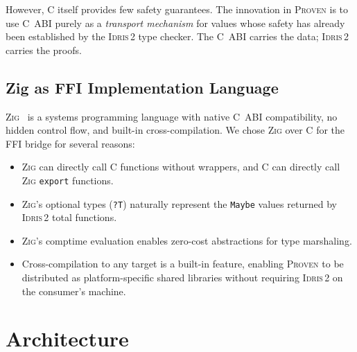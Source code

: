 \documentclass[11pt,a4paper]{article}
\newcommand{\proven}{\textsc{Proven}}
\newcommand{\idris}{\textsc{Idris\,2}}
\newcommand{\zig}{\textsc{Zig}}
\newcommand{\code}[1]{\texttt{#1}}
\begin{document}
However, C itself provides few safety guarantees. The innovation in
\proven{} is to use C~ABI purely as a \emph{transport mechanism} for
values whose safety has already been established by the \idris{} type
checker. The C~ABI carries the data; \idris{} carries the proofs.

\subsection{Zig as FFI Implementation Language}
\label{sec:zig-ffi}

\zig{}~\cite{zig2024} is a systems programming language with native C~ABI
compatibility, no hidden control flow, and built-in cross-compilation.
We chose \zig{} over C for the FFI bridge for several reasons:

\begin{itemize}[nosep]
  \item \zig{} can directly call C functions without wrappers, and C can
    directly call \zig{} \code{export} functions.
  \item \zig{}'s optional types (\code{?T}) naturally represent the
    \code{Maybe} values returned by \idris{} total functions.
  \item \zig{}'s comptime evaluation enables zero-cost abstractions for
    type marshaling.
  \item Cross-compilation to any target is a built-in feature, enabling
    \proven{} to be distributed as platform-specific shared libraries
    without requiring \idris{} on the consumer's machine.
\end{itemize}


\section{Architecture}
\label{sec:architecture}
\end{document}
